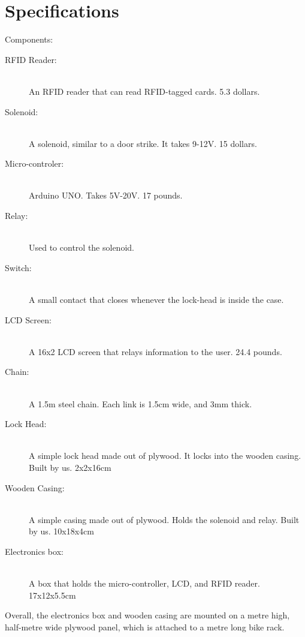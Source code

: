 \clearpage
\section{Specifications}

Components:
\begin{description}
      \item[RFID Reader:] \hfill \\
        An RFID reader that can read RFID-tagged cards. 5.3 dollars. \cite{specrfid}
      \item[Solenoid:] \hfill \\
        A solenoid, similar to a door strike. It takes 9-12V. 15 dollars. \cite{specsolenoid}
      \item[Micro-controler:] \hfill \\
        Arduino UNO. Takes 5V-20V. 17 pounds. \cite{specarduino}
      \item[Relay:] \hfill \\
        Used to control the solenoid. \cite{specrealy}
      \item[Switch:] \hfill \\
        A small contact that closes whenever the lock-head is inside the case. \cite{specswitch}
      \item[LCD Screen:] \hfill \\
        A 16x2 LCD screen that relays information to the user. 24.4 pounds. \cite{speclcd}
      \item[Chain:] \hfill \\
        A 1.5m steel chain. Each link is 1.5cm wide, and 3mm thick.
      \item[Lock Head:] \hfill \\
        A simple lock head made out of plywood. It locks into the wooden casing. Built by us.
        2x2x16cm
      \item[Wooden Casing:] \hfill \\
        A simple casing made out of plywood. Holds the solenoid and relay. Built by us.
        10x18x4cm
      \item[Electronics box:] \hfill \\
        A box that holds the micro-controller, LCD, and RFID reader. 17x12x5.5cm

\end{description}
Overall, the electronics box and wooden casing are mounted on a metre high, half-metre wide plywood panel, which is attached to a metre long bike rack.
\clearpage

